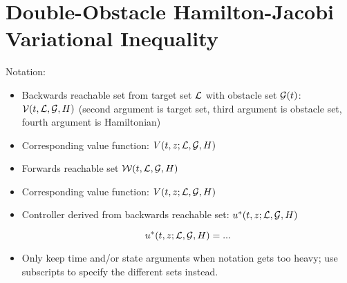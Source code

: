 \section{Double-Obstacle Hamilton-Jacobi Variational Inequality \label{sec:HJIVI}}
Notation:
\begin{itemize}
\item Backwards reachable set from target set $\mathcal{L}$ with obstacle set $\mathcal{G}(t)$: $\mathcal{V}(t, \mathcal{L}, \mathcal{G}, H)$ (second argument is target set, third argument is obstacle set, fourth argument is Hamiltonian)
\item Corresponding value function: $V(t, z; \mathcal{L}, \mathcal{G}, H)$
\item Forwards reachable set $\mathcal{W}(t, \mathcal{L}, \mathcal{G}, H)$
\item Corresponding value function: $V(t, z; \mathcal{L}, \mathcal{G}, H)$
\item Controller derived from backwards reachable set: $u^*(t, z; \mathcal{L}, \mathcal{G}, H)$

\begin{equation}
\label{eq:opt_ctrl}
u^*(t, z; \mathcal{L}, \mathcal{G}, H) = ...
\end{equation}

\item Only keep time and/or state arguments when notation gets too heavy; use subscripts to specify the different sets instead.
\end{itemize}